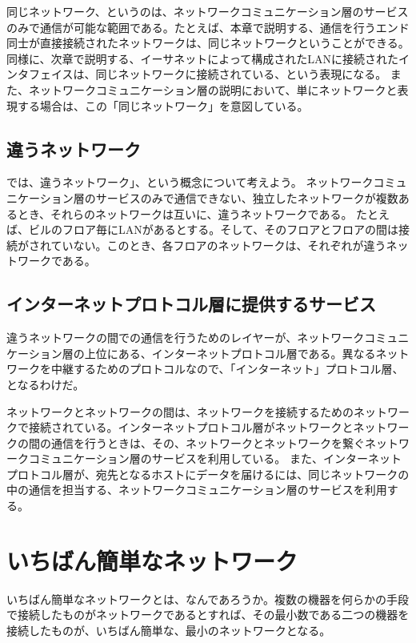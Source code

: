 同じネットワーク、というのは、ネットワークコミュニケーション層のサービスのみで通信が可能な範囲である。たとえば、本章で説明する、通信を行うエンド同士が直接接続されたネットワークは、同じネットワークということができる。同様に、次章で説明する、イーサネットによって構成されたLANに接続されたインタフェイスは、同じネットワークに接続されている、という表現になる。
また、ネットワークコミュニケーション層の説明において、単にネットワークと表現する場合は、この「同じネットワーク」を意図している。


\subsection{違うネットワーク}

では、違うネットワーク｣、という概念について考えよう。
ネットワークコミュニケーション層のサービスのみで通信できない、独立したネットワークが複数あるとき、それらのネットワークは互いに、違うネットワークである。
たとえば、ビルのフロア毎にLANがあるとする。そして、そのフロアとフロアの間は接続がされていない。このとき、各フロアのネットワークは、それぞれが違うネットワークである。

\subsection{インターネットプロトコル層に提供するサービス}

違うネットワークの間での通信を行うためのレイヤーが、ネットワークコミュニケーション層の上位にある、インターネットプロトコル層である。異なるネットワークを中継するためのプロトコルなので、「インターネット」プロトコル層、となるわけだ。

ネットワークとネットワークの間は、ネットワークを接続するためのネットワークで接続されている。インターネットプロトコル層がネットワークとネットワークの間の通信を行うときは、その、ネットワークとネットワークを繋ぐネットワークコミュニケーション層のサービスを利用している。
また、インターネットプロトコル層が、宛先となるホストにデータを届けるには、同じネットワークの中の通信を担当する、ネットワークコミュニケーション層のサービスを利用する。


\section{いちばん簡単なネットワーク}

いちばん簡単なネットワークとは、なんであろうか。複数の機器を何らかの手段で接続したものがネットワークであるとすれば、その最小数である二つの機器を接続したものが、いちばん簡単な、最小のネットワークとなる。

